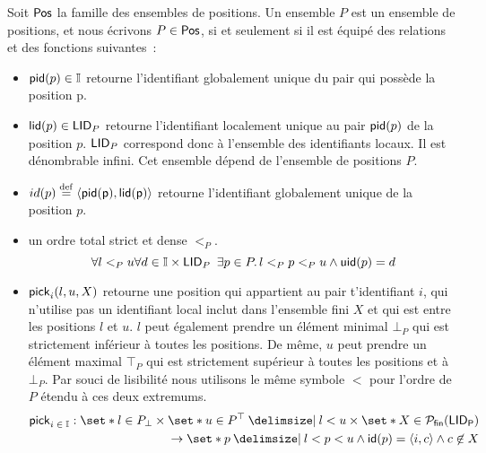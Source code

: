 \begin{definition}[Positions]\label{def:pos}
Soit $\trm{Pos}$ la famille des ensembles de positions.
Un ensemble $P$ est un ensemble de positions, et nous écrivons $P \in \trm{Pos}$, si et seulement si il est équipé des relations et des fonctions suivantes~:
\begin{itemize}
\item $\trm{pid}(p) \in \mathbb{I}$ retourne l'identifiant globalement unique du pair qui possède la position p.

\item $\trm{lid}(p) \in \trm{LID}_P$ retourne l'identifiant localement unique au pair $\trm{pid}(p)$ de la position $p$.
$\trm{LID}_P$ correspond donc à l'ensemble des identifiants locaux.
Il est dénombrable infini.
Cet ensemble dépend de l'ensemble de positions $P$.

\item $id(p) \defeq \tuple*{\trm{\trm{pid}(p), \trm{lid}(p)}}$ retourne l'identifiant globalement unique de la position $p$.
\item un ordre total strict et dense $<_P$.
\begin{equation*}
\forall l <_P u \forall d \in \mathbb{I} \times \trm{LID}_P\ \exists p \in P \qsep l <_P p <_P u \land \trm{uid}(p) = d
\end{equation*}

\item $\trm{pick}_i(l, u, X)$ retourne une position qui appartient au pair t'identifiant $i$, qui n'utilise pas un identifiant local inclut dans l'ensemble fini $X$ et qui est entre les positions $l$ et $u$.
$l$ peut également prendre un élément minimal $\bot_P$ qui est strictement inférieur à toutes les positions.
De même, $u$ peut prendre un élément maximal $\top_P$ qui est strictement supérieur à toutes les positions et à $\bot_P$.
Par souci de lisibilité nous utilisons le même symbole $<$ pour l'ordre de $P$ étendu à ces deux extremums.
\begin{equation*}\begin{split}
    \trm{pick}_{i\;\in\;\mathbb{I}}: \set*{l \in P_{\bot}} \times \set*{u \in P^{\top} \given l < u} \times \set*{X \in \powerfset{\trm{LID_P}}}\\
    \to \set*{p \given l < p < u \land \trm{id}(p) = \tuple*{i, c} \land c \not\in X}
\end{split}\end{equation*}
\end{itemize}
\end{definition}

